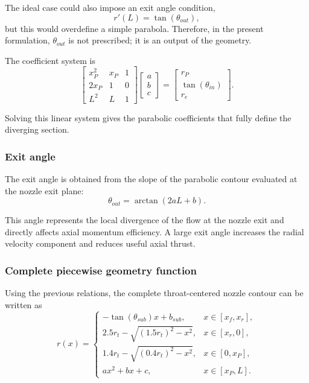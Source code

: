 \documentclass[journal,article,submit,oneauthor]{Definitions/mdpi}
\begin{document}
The ideal case could also impose an exit angle condition,
\begin{equation}
r'(L)=\tan(\theta_{out}),
\end{equation}
but this would overdefine a simple parabola. Therefore, in the present formulation, $\theta_{out}$ is not prescribed; it is an output of the geometry.

The coefficient system is
\begin{equation}
\begin{bmatrix}
x_P^2 & x_P & 1\\
2x_P & 1 & 0\\
L^2 & L & 1
\end{bmatrix}
\begin{bmatrix}
a\\b\\c
\end{bmatrix}
=
\begin{bmatrix}
r_P\\ \tan(\theta_{in})\\ r_e
\end{bmatrix}.
\label{eq:parabola_matrix}
\end{equation}

Solving this linear system gives the parabolic coefficients that fully define the diverging section.

\subsubsection{Exit angle}

The exit angle is obtained from the slope of the parabolic contour evaluated at the nozzle exit plane:
\begin{equation}
\theta_{out}=\arctan\left(2aL+b\right).
\label{eq:theta_out}
\end{equation}

This angle represents the local divergence of the flow at the nozzle exit and directly affects axial momentum efficiency. A large exit angle increases the radial velocity component and reduces useful axial thrust.

\subsubsection{Complete piecewise geometry function}

Using the previous relations, the complete throat-centered nozzle contour can be written as
\begin{equation}
r(x)=
\begin{cases}
-\tan(\theta_{sub})x+b_{sub},
& x\in[x_f,x_r],\\[6pt]
2.5r_t-\sqrt{(1.5r_t)^2-x^2},
& x\in[x_r,0],\\[6pt]
1.4r_t-\sqrt{(0.4r_t)^2-x^2},
& x\in[0,x_P],\\[6pt]
ax^2+bx+c,
& x\in[x_P,L].
\end{cases}
\label{eq:piecewise_nozzle}
\end{equation}
\end{document}
